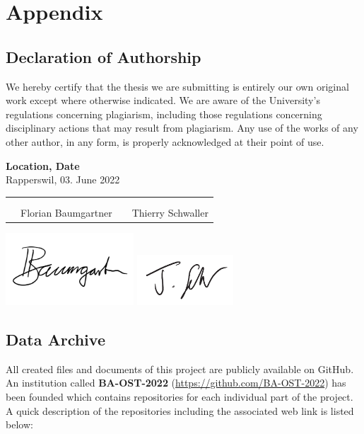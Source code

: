 \chapter{Appendix}
\clearpage

\section{Declaration of Authorship} \label{Declaration of Authorship}
We hereby certify that the thesis we are submitting is entirely our own original work except where otherwise indicated. We are aware of the University’s regulations concerning plagiarism, including those regulations concerning disciplinary actions that may result from plagiarism. Any use of the works of any other author, in any form, is properly acknowledged at their point of use.

\bigskip
\textbf{Location, Date} \\
Rapperswil, 03. June 2022

\vspace{1.2cm}
\begin{tabular}{@{}p{0.1cm}p{6cm}p{0.6cm}p{6cm}@{}}
   & \hrulefill          &  & \hrulefill        \\ \\[-0.7em]
   & Florian Baumgartner &  & Thierry Schwaller \\
\end{tabular}

\includegraphics[width=4.8cm, align=t, smash=br, hshift=0.9cm, vshift=2.55cm]{appendix/Signature_Florian_Baumgartner.pdf}
\includegraphics[width=3.6cm, align=t, smash=br, hshift=8.25cm, vshift=2.2cm]{appendix/Signature_Thierry_Schwaller.pdf}
\newpage

\section{Data Archive} \label{Data Archive}
All created files and documents of this project are publicly available on GitHub. An institution called \textbf{BA-OST-2022} (\url{https://github.com/BA-OST-2022}) has been founded which contains repositories for each individual part of the project.
A quick description of the repositories including the associated web link is listed below:

